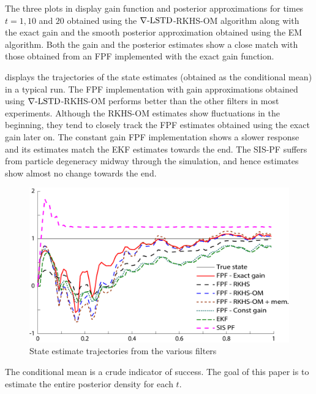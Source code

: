 The three plots in  display  gain function and posterior approximations for times $t = 1,10$ and $20$ obtained using the $\nabla\text{-LSTD}$-RKHS-OM algorithm along with the exact gain and the smooth posterior approximation obtained using the EM algorithm. Both the gain and the posterior estimates show a close match with those obtained from an FPF implemented with the exact gain function.


 displays the trajectories of the state estimates (obtained as the conditional mean) in a typical run.  The FPF implementation with gain approximations obtained using $\nabla\text{-LSTD}$-RKHS-OM  performs better than the other filters in most experiments. Although the RKHS-OM estimates show fluctuations in the beginning, they tend to closely track the FPF estimates obtained using the exact gain later on. The constant gain FPF implementation shows a slower response and its estimates match the EKF estimates towards the end. The SIS-PF suffers from particle degeneracy midway through the simulation, and hence estimates show almost no change towards the end.

\begin{figure}[htbp]
	\centering
	\includegraphics[width = 5in]{images/Chap4_param_est_state_comparison}
	\caption{ State estimate trajectories from the various filters}
	\label{fig:steady_state_estimate}
\end{figure}

The conditional mean is a crude indicator of success. The goal of this paper is to estimate the entire posterior density for each $t$.

